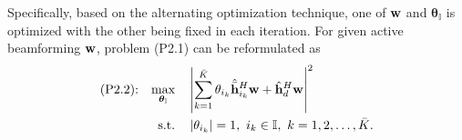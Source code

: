 \documentclass[draftclsnofoot,onecolumn,12pt]{IEEEtran}
\begin{document}
Specifically, based on the alternating optimization technique, 
one of ${\bf w}$ and ${\bm \theta}_{\mathbb I}$ is optimized with the other being fixed in each iteration. 
For given active beamforming $\bf w$, problem (P2.1) can be reformulated as
\begin{align}
\text{(P2.2):} \quad \underset{{\bm \theta}_{\mathbb I}}{\text{max}}
& \quad \left|\sum_{k=1}^{\bar K}{ \theta}_{i_k}\hat{\bar{{\bf h}}}_{i_k}^H{\bf w} + \hat{\bf h}_d^H {\bf w}\right|^2\label{P2.1obj}\\
 \text{s.t.} & \quad  \left|\theta_{i_k}\right|=1 ,~ i_k  \in \mathbb{I}, ~ k=1,2,\ldots,{\bar{K}}. 
\end{align}
\end{document}
